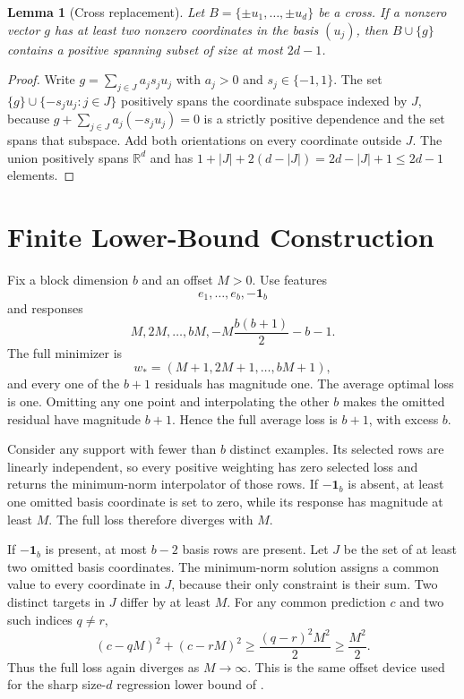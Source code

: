 \documentclass[twoside]{article}
\newtheorem{lemma}[theorem]{Lemma}
\newcommand{\R}{\mathbb R}
\begin{document}
\begin{lemma}[Cross replacement]
\label{lem:replacement}
Let $B=\{\pm u_1,\ldots,\pm u_d\}$ be a cross. If a nonzero vector $g$ has at least two nonzero coordinates in the basis $(u_j)$, then $B\cup\{g\}$ contains a positive spanning subset of size at most $2d-1$.
\end{lemma}

\begin{proof}
Write $g=\sum_{j\in J}a_js_ju_j$ with $a_j>0$ and $s_j\in\{-1,1\}$. The set $\{g\}\cup\{-s_ju_j:j\in J\}$ positively spans the coordinate subspace indexed by $J$, because $g+\sum_{j\in J}a_j(-s_ju_j)=0$ is a strictly positive dependence and the set spans that subspace. Add both orientations on every coordinate outside $J$. The union positively spans $\R^d$ and has $1+|J|+2(d-|J|)=2d-|J|+1\leq2d-1$ elements.
\end{proof}

\section{Finite Lower-Bound Construction}
\label{app:lower}

Fix a block dimension $b$ and an offset $M>0$. Use features
\begin{equation}
 e_1,\ldots,e_b,-\mathbf1_b
\end{equation}
and responses
\begin{equation}
 M,2M,\ldots,bM,
 -M\frac{b(b+1)}2-b-1.
 \label{eq:block-responses}
\end{equation}
The full minimizer is
\begin{equation}
 w_*=(M+1,2M+1,\ldots,bM+1),
\end{equation}
and every one of the $b+1$ residuals has magnitude one. The average optimal loss is one. Omitting any one point and interpolating the other $b$ makes the omitted residual have magnitude $b+1$. Hence the full average loss is $b+1$, with excess $b$.

Consider any support with fewer than $b$ distinct examples. Its selected rows are linearly independent, so every positive weighting has zero selected loss and returns the minimum-norm interpolator of those rows. If $-\mathbf1_b$ is absent, at least one omitted basis coordinate is set to zero, while its response has magnitude at least $M$. The full loss therefore diverges with $M$.

If $-\mathbf1_b$ is present, at most $b-2$ basis rows are present. Let $J$ be the set of at least two omitted basis coordinates. The minimum-norm solution assigns a common value to every coordinate in $J$, because their only constraint is their sum. Two distinct targets in $J$ differ by at least $M$. For any common prediction $c$ and two such indices $q\ne r$,
\begin{equation}
 (c-qM)^2+(c-rM)^2\geq \frac{(q-r)^2M^2}{2}\geq\frac{M^2}{2}.
\end{equation}
Thus the full loss again diverges as $M\to\infty$. This is the same offset device used for the sharp size-$d$ regression lower bound of \citet{hanneke2025data}.
\end{document}
